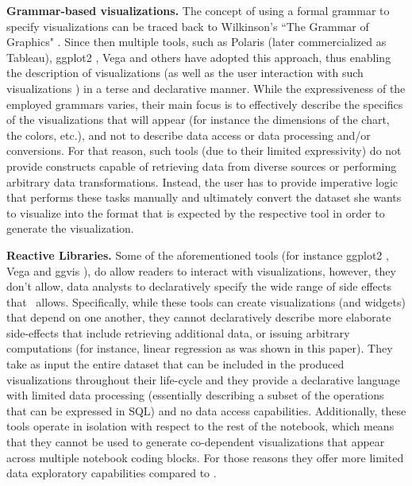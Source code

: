 {\bf Grammar-based visualizations.} The concept of using a formal grammar to specify visualizations can be traced back to Wilkinson's ``The Grammar of Graphics" \cite{Wilkinson:2005:GG:1088896}. Since then multiple tools, such as Polaris \cite{stolte2002polaris} (later commercialized as Tableau), ggplot2 \cite{wickham2009ggplot2}, Vega \cite{satyanarayan2015vega, vega} and others \cite{ggvis, bostock2009protovis, d3} have adopted this approach, thus enabling the description of visualizations (as well as the user interaction with such visualizations \cite{Wu:2016:DAI:2939502.2939517, satyanarayan2016reactive}) in a terse and declarative manner. While the expressiveness of the employed grammars varies, their main focus is to effectively describe the specifics of the visualizations that will appear (for instance the dimensions of the chart, the colors, etc.), and not to describe data access or data processing and/or conversions. For that reason, such tools (due to their limited expressivity) do not provide constructs capable of retrieving data from diverse sources or performing arbitrary data transformations. Instead, the user has to provide imperative logic that performs these tasks manually and ultimately convert the dataset she wants to visualize into the format that is expected by the respective tool in order to generate the visualization.
 
{\bf Reactive Libraries.} Some of the aforementioned tools (for instance  ggplot2 \cite{wickham2009ggplot2}, Vega \cite{satyanarayan2015vega, vega, Altair, ipyvega} and ggvis \cite{ggvis}), do allow readers to interact with visualizations, however, they don't allow, data analysts to declaratively specify the wide range of side effects that \projname\ allows. Specifically, while these tools can create visualizations (and widgets) that depend on one another, they cannot declaratively describe more elaborate side-effects that include retrieving additional data, or issuing arbitrary computations (for instance, linear regression as was shown in this paper). They take as input the entire dataset that can be included in the produced visualizations throughout their life-cycle and they provide a declarative language with limited data processing (essentially describing a subset of the operations that can be expressed in SQL) and no data access capabilities. Additionally, these tools operate in isolation with respect to the rest of the notebook, which means that they cannot be used to generate co-dependent visualizations that appear across multiple notebook coding blocks. For those reasons they offer more limited data exploratory capabilities compared to \projname. 



